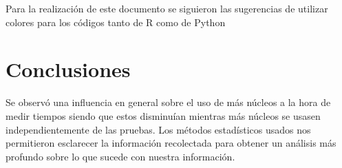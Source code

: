 \documentclass{article}
\begin{document}
Para la realización de este documento se siguieron las sugerencias de utilizar colores para los códigos tanto de R como de Python\cite{wet,redmode}

\section{Conclusiones}
Se observó una influencia en general sobre el uso de más núcleos a la hora de medir tiempos siendo que estos disminuían mientras más núcleos se usasen independientemente de las pruebas. Los métodos estadísticos usados nos permitieron esclarecer la información recolectada para obtener un análisis más profundo sobre lo que sucede con nuestra información.



\end{document}
